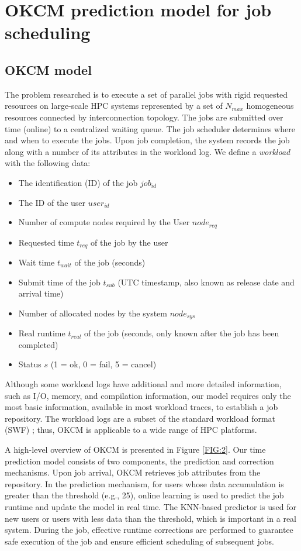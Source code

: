 \documentclass[a4paper,fleqn]{cas-sc}
\begin{document}
\section{OKCM prediction model for job scheduling} \label{sect3}
\subsection{OKCM model}
The problem researched is to execute a set of parallel jobs with rigid requested resources on large-scale HPC systems represented by a set of $N_{max}$ homogeneous resources connected by interconnection topology. The jobs are submitted over time (online) to a centralized waiting queue. The job scheduler determines where and when to execute the jobs. Upon job completion, the system records the job along with a number of its attributes in the workload log. We define a \textit{workload} with the following data:
\begin{itemize} 
	\item The identification (ID) of the job $job_{id}$ 
	\item The ID of the user $user_{id}$ 
	\item Number of compute nodes required by the User $node_{req}$ 
	\item Requested time $t_{req}$ of the job by the user 
	\item Wait time $t_{wait}$ of the job (seconds)  
	\item Submit time of the job $t_{sub}$ (UTC timestamp, also known as release date and arrival time) 
	\item Number of allocated nodes by the system $node_{sys}$
	\item Real runtime $t_{real}$ of the job (seconds, only known after the job has been completed)
	\item Status $s$ (1 = ok, 0 = fail, 5 = cancel)
\end{itemize}

Although some workload logs have additional and more detailed information, such as I/O, memory, and compilation information, our model requires only the most basic information, available in most workload traces, to establish a job repository. The workload logs are a subset of the standard workload format (SWF) \cite{10JPDC}; thus, OKCM is applicable to a wide range of HPC platforms.

A high-level overview of OKCM is presented in Figure \ref{FIG:2}. Our time prediction model consists of two components, the prediction and correction mechanisms. Upon job arrival, OKCM retrieves job attributes from the repository. In the prediction mechanism, for users whose data accumulation is greater than the threshold (e.g., 25), online learning is used to predict the job runtime and update the model in real time. The KNN-based predictor is used for new users or users with less data than the threshold, which is important in a real system. During the job, effective runtime corrections are performed to guarantee safe execution of the job and ensure efficient scheduling of subsequent jobs.
\end{document}

